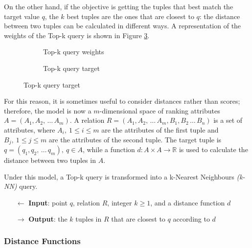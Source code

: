 \documentclass[english]{article}
\begin{document}
On the other hand, if the objective is getting the tuples that best match the target value \(q\), the \(k\) best tuples are the ones that are closest to \(q\): the distance between two tuples can be calculated in different ways.
A representation of the weights of the Top-k query is shown in Figure \ref{subfig:topk-target}.

\begin{figure}[htbp]
  \centering
  \bigskip
  \begin{subfigure}[t]{0.495\textwidth}
    \centering
    \bigskip
    \caption{Top-k query weights}
    \label{subfig:topk-weights}
    \bigskip
  \end{subfigure}
  \begin{subfigure}[t]{0.495\textwidth}
    \centering
    \bigskip
    \caption{Top-k query target}
    \label{subfig:topk-target}
    \bigskip
  \end{subfigure}
  \bigskip
\end{figure}

For this reason, it is sometimes useful to consider distances rather than scores;
therefore, the model is now a \(m\)-dimensional space of ranking attributes \(A = \left( A_1, A_2, \,\ldots\, A_m \right)\).
A relation \(R = \left( A_1, A_2, \,\ldots\, A_m, B_1, B_2 \,\ldots\, B_n \right)\) is a set of attributes, where \(A_i, \ 1 \leq i \leq m\) are the attributes of the first tuple and \(B_j, \ 1 \leq j \leq m\) are the attributes of the second tuple.
The target tuple is \(q = \left( q_1, q_2, \,\ldots\, q_m \right),\ q \in A\), while a function \(d: A \times A \rightarrow \mathbb{R}\) is used to calculate the distance between two tuples in \(A\).

\bigskip
Under this model, a Top-k query is transformed into a k-Nearest Neighbours \textit{(k-NN)} query.

\begin{itemize}
  \item[\(\leftarrow\)] \textbf{Input}: point \(q\), relation \(R\), integer \(k \geq 1\), and a distance function \(d\)
  \item[\(\rightarrow\)] \textbf{Output}: the \(k\) tuples in \(R\) that are closest to \(q\) according to \(d\)
\end{itemize}

\subsubsection{Distance Functions}
\end{document}
